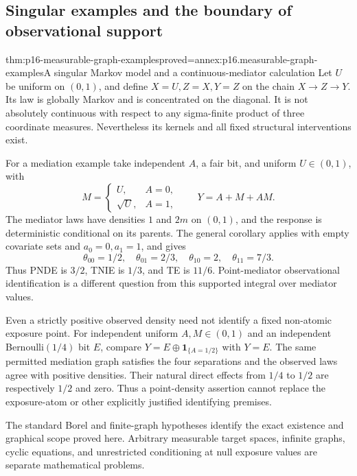 \subsection{Singular examples and the boundary of observational support}

\begin{hbtheorem}{thm:p16-measurable-graph-examples}{proved=annex:p16.measurable-graph-examples}{A singular Markov model and a continuous-mediator calculation}
Let \(U\) be uniform on \((0,1)\), and define \(X=U,Z=X,Y=Z\)
on the chain \(X\to Z\to Y\). Its law is globally Markov and is
concentrated on the diagonal. It is not absolutely continuous with
respect to any sigma-finite product of three coordinate measures.
Nevertheless its kernels and all fixed structural interventions exist.

For a mediation example take independent \(A\), a fair bit, and
uniform \(U\in(0,1)\), with
\[
 M=\begin{cases}U,&A=0,\\\sqrt U,&A=1,\end{cases}
 \qquad Y=A+M+AM.
\]
The mediator laws have densities \(1\) and \(2m\) on \((0,1)\),
and the response is deterministic conditional on its parents. The general
corollary applies with empty covariate sets and \(a_0=0,a_1=1\), and gives
\[
 \theta_{00}=1/2,\quad\theta_{01}=2/3,
 \quad\theta_{10}=2,\quad\theta_{11}=7/3.
\]
Thus PNDE is \(3/2\), TNIE is \(1/3\), and TE is \(11/6\).
Point-mediator observational identification is a different question from
this supported integral over mediator values.

Even a strictly positive observed density need not identify a fixed
non-atomic exposure point. For independent uniform \(A,M\in(0,1)\)
and an independent Bernoulli\((1/4)\) bit \(E\), compare
\(Y=E\oplus\mathbf1_{\{A=1/2\}}\) with \(Y=E\).
The same permitted mediation graph satisfies the four separations and
the observed laws agree with positive densities. Their natural direct
effects from \(1/4\) to \(1/2\) are respectively \(1/2\) and zero.
Thus a point-density assertion cannot replace the exposure-atom or
other explicitly justified identifying premises.
\end{hbtheorem}

The standard Borel and finite-graph hypotheses identify the exact
existence and graphical scope proved here. Arbitrary measurable target
spaces, infinite graphs, cyclic equations, and unrestricted conditioning
at null exposure values are separate mathematical problems.
